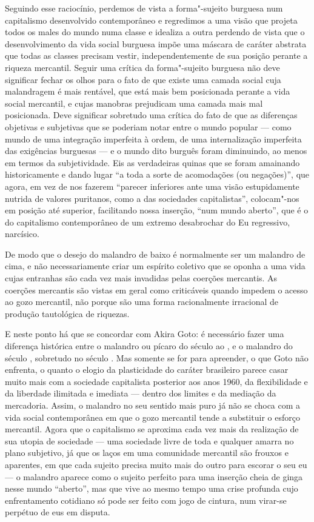 Seguindo esse raciocínio, perdemos de vista a forma"-sujeito burguesa num
capitalismo desenvolvido contemporâneo e regredimos a uma visão que
projeta todos os males do mundo numa classe e idealiza a outra perdendo
de vista que o desenvolvimento da vida social burguesa impõe uma máscara
de caráter abstrata que todas as classes precisam vestir,
independentemente de sua posição perante a riqueza mercantil. Seguir uma
crítica da forma"-sujeito burguesa não deve significar fechar os olhos
para o fato de que existe uma camada social cuja malandragem é mais
rentável, que está mais bem posicionada perante a vida social mercantil,
e cujas manobras prejudicam uma camada mais mal posicionada. Deve
significar sobretudo uma crítica do fato de que as diferenças objetivas
e subjetivas que se poderiam notar entre o mundo popular --- como mundo
de uma integração imperfeita à ordem, de uma internalização imperfeita
das exigências burguesas --- e o mundo dito burguês foram diminuindo, ao
menos em termos da subjetividade. Eis as verdadeiras quinas que se foram
amainando historicamente e dando lugar ``a toda a sorte de acomodações
(ou negações)'', que agora, em vez de nos fazerem ``parecer inferiores
ante uma visão estupidamente nutrida de valores puritanos, como a das
sociedades capitalistas'', colocam"-nos em posição até superior,
facilitando nossa inserção, ``num mundo aberto'', que é o do capitalismo
contemporâneo de um extremo desabrochar do Eu regressivo, narcísico.

De modo que o desejo do malandro de baixo é normalmente ser um malandro
de cima, e não necessariamente criar um espírito coletivo que se oponha
a uma vida cujas entranhas são cada vez mais invadidas pelas coerções
mercantis. As coerções mercantis são vistas em geral como criticáveis
quando impedem o acesso ao gozo mercantil, não porque são uma forma
racionalmente irracional de produção tautológica de riquezas.

E neste ponto há que se concordar com Akira Goto: é necessário fazer uma
diferença histórica entre o malandro ou pícaro do século  ao , e o
malandro do século , sobretudo no século . Mas somente se for para
apreender, o que Goto não enfrenta, o quanto o elogio da plasticidade do
caráter brasileiro parece casar muito mais com a sociedade capitalista
posterior aos anos 1960, da flexibilidade e da liberdade ilimitada e
imediata --- dentro dos limites e da mediação da mercadoria. Assim, o
malandro no seu sentido mais puro já não se choca com a vida social
contemporânea em que o gozo mercantil tende a substituir o esforço
mercantil. Agora que o capitalismo se aproxima cada vez mais da
realização de sua utopia de sociedade --- uma sociedade livre de toda e
qualquer amarra no plano subjetivo, já que os laços em uma comunidade
mercantil são frouxos e aparentes, em que cada sujeito precisa muito
mais do outro para escorar o seu eu --- o malandro aparece como o sujeito
perfeito para uma inserção cheia de ginga nesse mundo ``aberto'', mas
que vive ao mesmo tempo uma crise profunda cujo enfrentamento cotidiano
só pode ser feito com jogo de cintura, num virar-se perpétuo de eus em
disputa.

